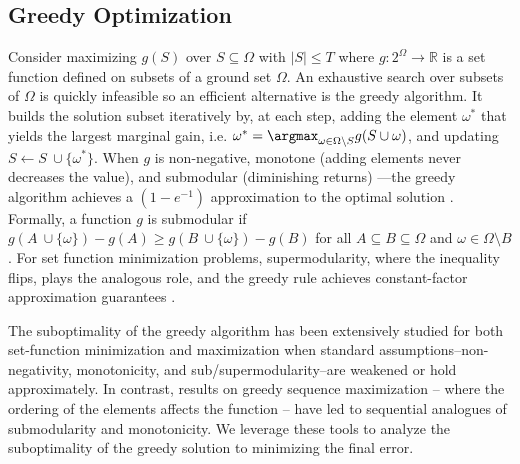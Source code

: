 \documentclass{article} %
\begin{document}
\subsection{Greedy Optimization} \label{sec:bggreedy}

Consider maximizing $g(S)$ over $S\subseteq \Omega$ with $|S| \leq T$
where $g: 2^{\Omega} \to \mathbb{R}$ is a set function defined on subsets of a ground set $\Omega$. An exhaustive search over subsets of $\Omega$ is quickly infeasible so an efficient alternative is the greedy algorithm.
It builds the solution subset iteratively by, at each step, adding the element $\omega^*$ that yields the largest marginal gain, i.e. $\omega^* =  \argmax_{\omega \in \Omega \setminus S} g(S \cup \omega)$, and updating $S \leftarrow S \ \cup \{\omega^*\}$. When $g$ is non-negative, monotone (adding elements never decreases the value), and submodular (diminishing returns)
—the greedy algorithm achieves a $(1 - e^{-1})$ approximation to the optimal solution \citep{nemhauser1978analysis}. Formally, a function $g$ is submodular if $g(A \ \cup \{\omega\}) - g(A) \geq g(B \ \cup \{\omega\}) - g(B)$ for all $A \subseteq B \subseteq \Omega$ and $\omega \in \Omega \setminus B$.
For set function minimization problems, supermodularity, where the inequality flips, plays the analogous role, and the greedy rule achieves constant-factor approximation guarantees \citep{liberty2017greedy}.

The suboptimality of the greedy algorithm has been extensively studied for both set-function minimization \citep{bounia2023approximating}  and maximization \citep{das2018approximate,feige2011maximizing,bian2017guarantees,harshaw2019submodular} when standard assumptions--non-negativity, monotonicity, and sub/supermodularity--are weakened or hold approximately.
In contrast, results on greedy sequence maximization \citep{streeter2008online,alaei2021maximizing,zhang2015string,bernardini2020through,van2024performance,tschiatschek2017selecting} -- where the ordering of the elements affects the function -- have led to sequential analogues of submodularity and monotonicity. We leverage these tools to analyze the suboptimality of the greedy solution to minimizing the final error.
\end{document}
